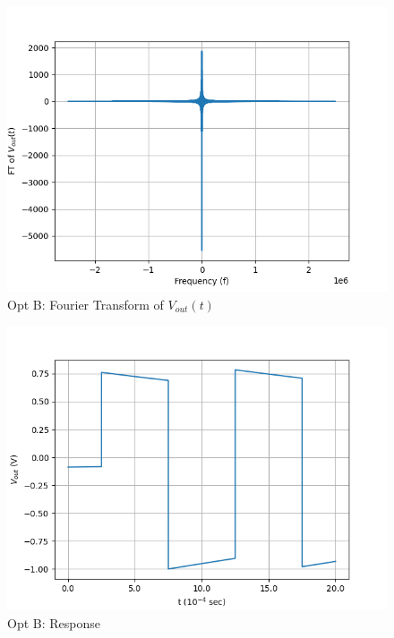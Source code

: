 \documentclass[journal,12pt,twocolumn]{IEEEtran}
\theoremstyle{remark}
\begin{document}
\begin{figure}[!h]
    \centering
    \includegraphics[width = \columnwidth]{2023/PH/37/figs/opt_b_ft.png}
    \caption{Opt B: Fourier Transform of $V_{out}(t)$}
    \label{fig:b_ft_gate.ph.23.37}
\end{figure}
\begin{figure}[!h]
    \centering
    \includegraphics[width = \columnwidth]{2023/PH/37/figs/opt_b_res.png}
    \caption{Opt B: Response}
    \label{fig:b_res_gate.ph.23.37}
\end{figure}
\end{document}
